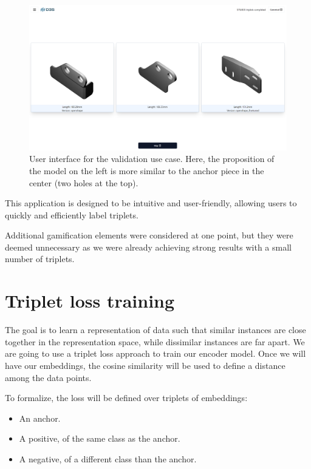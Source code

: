 \begin{figure}[]
  \centering
  \includegraphics[width=0.8\columnwidth]{images/tinder3d_validation.png}
  \caption{User interface for the validation use case. Here, the proposition of the model on the left is more similar to the anchor piece in the center (two holes at the top).}
  \label{fig:validation_use_case}
\end{figure}

This application is designed to be intuitive and user-friendly, allowing users to quickly and efficiently label triplets.

Additional gamification elements were considered at one point, but they were deemed unnecessary as we were already achieving strong results with a small number of triplets.

\section{Triplet loss training}
\label{sec:triplet-loss-training}

The goal is to learn a representation of data such that similar instances are close together in the representation space, while dissimilar instances are far apart. We are going to use a triplet loss approach to train our encoder model. Once we will have our embeddings, the cosine similarity will be used to define a distance among the data points.

To formalize, the loss will be defined over triplets of embeddings:
\begin{itemize}
  \item An anchor.
  \item A positive, of the same class as the anchor.
  \item A negative, of a different class than the anchor.
\end{itemize}

\vspace{0.3cm}

